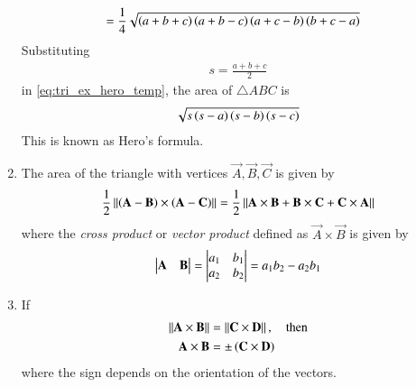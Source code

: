 \begin{enumerate}[label=\thesection.\arabic*.,ref=\thesection.\theenumi]
{\begin{align}
\\
&= \frac{1}{4}\sqrt{\left(a+b+c\right)\left(a+b-c\right)\left(a+c-b\right)\left(b+c-a\right)}
\label{eq:tri_ex_hero_temp}
\end{align}
}
Substituting 
%
\begin{align}
s=\frac{a+b+c}{2}
\end{align}
%
in \eqref{eq:tri_ex_hero_temp}, the area of $\triangle ABC$ is 
%
\begin{align}
\label{eq:tri_area_hero}
\sqrt{s\left(s-a\right)\left(s-b\right)\left(s-c\right)}
\end{align}
%
This is known as Hero's formula.
\item The area of the triangle with vertices $\vec{A}, \vec{B}, \vec{C}$ is given by 
	\label{prop:area2d}
\begin{align}
  \label{eq:area2d}
	\frac{1}{2}\left\lVert\left(\mathbf{A}-\mathbf{B}\right) \times \left(\mathbf{A}-\mathbf{C}\right)\right\rVert
 = 
 \frac{1}{2}\left\lVert\mathbf{A} \times \mathbf{B}+\mathbf{B} \times \mathbf{C}+\mathbf{C} \times \mathbf{A}\right\rVert
  \end{align}
where the {\em cross product} or {\em vector product} defined as $\vec{A}\times \vec{B}$ is given by  
\begin{align}
  \label{eq:det2d}
 \begin{vmatrix}\mathbf{A} & \mathbf{B}\end{vmatrix} 
  = \begin{vmatrix}a_1 & b_1\\a_2 & b_2\end{vmatrix} = a_1b_2 - a_2 b_1
\end{align}
  \item If 
  \label{prop:area2d-norm}
\begin{align}
  \label{eq:area2d-norm}
	\left\lVert\mathbf{A}\times\mathbf{B}\right\rVert  &= \left\lVert\mathbf{C}\times \mathbf{D}\right\rVert, \quad \text{then}
	\\
	\mathbf{A}\times\mathbf{B}  &= \pm\left(\mathbf{C}\times \mathbf{D}\right)
  \end{align}
  where the sign depends on the orientation of the vectors.
\end{enumerate}
